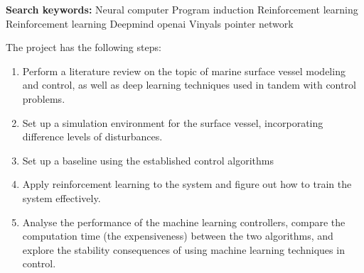 \textbf{Search keywords:}
Neural computer
Program induction
Reinforcement learning
Reinforcement learning
Deepmind
openai
Vinyals pointer network


The project has the following steps:
\begin{enumerate}
\item Perform a literature review on the topic of marine surface
  vessel modeling and control, as well as deep learning techniques
  used in tandem with control problems.
\item Set up a simulation environment for the surface vessel,
  incorporating difference levels of disturbances.
\item Set up a baseline using the established control algorithms
\item Apply reinforcement learning to the system and figure out how to
  train the system effectively.
\item Analyse the performance of the machine learning controllers,
  compare the computation time (the expensiveness) between the two
  algorithms, and explore the stability consequences of using machine
  learning techniques in control.
\end{enumerate}
